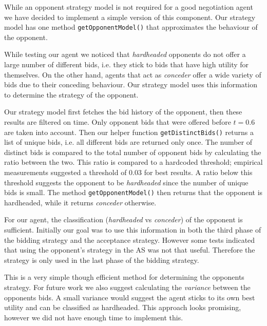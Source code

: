 
While an opponent strategy model is not required for a good negotiation agent we have decided to implement a simple version of this component. Our strategy model has one method \texttt{getOpponentModel()} that approximates the behaviour of the opponent. 

While testing our agent we noticed that \emph{hardheaded} opponents do not offer a large number of different bids, i.e. they stick to bids that have high utility for themselves. On the other hand, agents that act as \emph{conceder} offer a wide variety of bids due to their conceding behaviour. Our strategy model uses this information to determine the strategy of the opponent. 

Our strategy model first fetches the bid history of the opponent, then these results are filtered on time. Only opponent bids that were offered before $t=0.6$ are taken into account. Then our helper function \texttt{getDistinctBids()} returns a list of unique bids, i.e. all different bids are returned only once. The number of distinct bids is compared to the total number of opponent bids by calculating the ratio between the two. This ratio is compared to a hardcoded threshold; empirical measurements suggested a threshold of $0.03$ for best results. A ratio below this threshold suggests the opponent to be \emph{hardheaded} since the number of unique bids is small. The method \texttt{getOpponentModel()} then returns that the opponent is hardheaded, while it returns \emph{conceder} otherwise. 

For our agent, the classification (\emph{hardheaded} vs \emph{conceder}) of the opponent is sufficient. Initially our goal was to use this information in both the third phase of the bidding strategy and the acceptance strategy. However some tests indicated that using the opponent's strategy in the AS was not that useful. Therefore the strategy is only used in the last phase of the bidding strategy. 

This is a very simple though efficient method for determining the opponents strategy. For future work we also suggest calculating the \emph{variance} between the opponents bids. A small variance would suggest the agent sticks to its own best utility and can be classified as hardheaded. This approach looks promising, however we did not have enough time to implement this.
